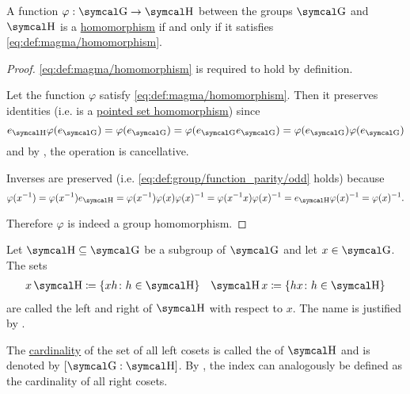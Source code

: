 \begin{proposition}\label{thm:group_homomorphism_single_condition}
  A function \( \varphi: \CG \to \CH \) between the groups \( \CG \) and \( \CH \) is a \hyperref[def:group/homomorphism]{homomorphism} if and only if it satisfies \eqref{eq:def:magma/homomorphism}.
\end{proposition}
\begin{proof}
  \Sufficiency \eqref{eq:def:magma/homomorphism} is required to hold by definition.

  \Necessity Let the function \( \varphi \) satisfy \eqref{eq:def:magma/homomorphism}. Then it preserves identities (i.e. is a \hyperref[def:pointed_set/homomorphism]{pointed set homomorphism}) since
  \begin{equation*}
    e_{\CH} \varphi(e_{\CG}) = \varphi(e_{\CG}) = \varphi(e_{\CG} e_{\CG}) = \varphi(e_{\CG}) \varphi(e_{\CG})
  \end{equation*}
  and by , the operation is cancellative.

  Inverses are preserved (i.e. \eqref{eq:def:group/function_parity/odd} holds) because
  \begin{equation*}
    \varphi(x^{-1})
    =
    \varphi(x^{-1}) e_{\CH}
    =
    \varphi(x^{-1}) \varphi(x) \varphi(x)^{-1}
    =
    \varphi(x^{-1} x) \varphi(x)^{-1}
    =
    e_{\CH} \varphi(x)^{-1}
    =
    \varphi(x)^{-1}.
  \end{equation*}

  Therefore \( \varphi \) is indeed a group homomorphism.
\end{proof}

\begin{definition}\label{def:group_cosets}
  Let \( \CH \subseteq \CG \) be a subgroup of \( \CG \) and let \( x \in \CG \). The sets
  \begin{align*}
    x \CH \coloneqq \{ xh \colon h \in \CH \}
    &&
    \CH x \coloneqq \{ hx \colon h \in \CH \}
  \end{align*}
  are called the left and right  of \( \CH \) with respect to \( x \). The name is justified by .

  The \hyperref[def:cardinal]{cardinality} of the set of all left cosets is called the  of \( \CH \) and is denoted by \( [\CG : \CH] \). By , the index can analogously be defined as the cardinality of all right cosets.
\end{definition}

